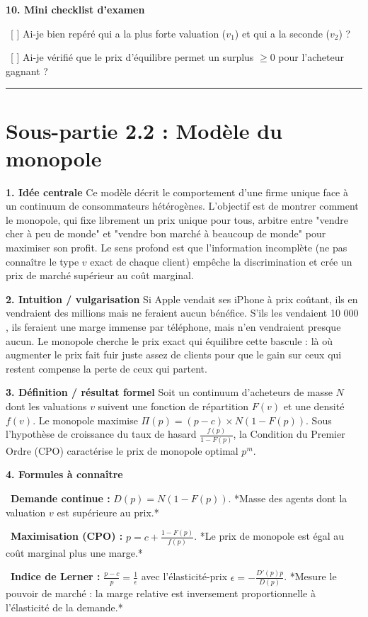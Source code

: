 \documentclass[11pt, a4paper]{report}
\begin{document}
\textbf{10. Mini checklist d'examen}
\par \textbullet\ [ ] Ai-je bien repéré qui a la plus forte valuation ($v_1$) et qui a la seconde ($v_2$) ?
\par \textbullet\ [ ] Ai-je vérifié que le prix d'équilibre permet un surplus $\ge 0$ pour l'acheteur gagnant ?

\vspace{1cm}\hrule\vspace{1cm}

\section{Sous-partie 2.2 : Modèle du monopole}

\textbf{1. Idée centrale}
Ce modèle décrit le comportement d'une firme unique face à un continuum de consommateurs hétérogènes. L'objectif est de montrer comment le monopole, qui fixe librement un prix unique pour tous, arbitre entre "vendre cher à peu de monde" et "vendre bon marché à beaucoup de monde" pour maximiser son profit. Le sens profond est que l'information incomplète (ne pas connaître le type $v$ exact de chaque client) empêche la discrimination et crée un prix de marché supérieur au coût marginal.

\textbf{2. Intuition / vulgarisation}
Si Apple vendait ses iPhone à prix coûtant, ils en vendraient des millions mais ne feraient aucun bénéfice. S'ils les vendaient 10 000 \texteuro{}, ils feraient une marge immense par téléphone, mais n'en vendraient presque aucun. Le monopole cherche le prix exact qui équilibre cette bascule : là où augmenter le prix fait fuir juste assez de clients pour que le gain sur ceux qui restent compense la perte de ceux qui partent.

\textbf{3. Définition / résultat formel}
Soit un continuum d'acheteurs de masse $N$ dont les valuations $v$ suivent une fonction de répartition $F(v)$ et une densité $f(v)$. 
Le monopole maximise $\Pi(p) = (p-c) \times N(1-F(p))$.
Sous l'hypothèse de croissance du taux de hasard $\frac{f(p)}{1-F(p)}$, la Condition du Premier Ordre (CPO) caractérise le prix de monopole optimal $p^m$.

\textbf{4. Formules à connaître}
\par \textbullet\ \textbf{Demande continue :} $D(p) = N(1 - F(p))$. *Masse des agents dont la valuation $v$ est supérieure au prix.*
\par \textbullet\ \textbf{Maximisation (CPO) :} $p = c + \frac{1 - F(p)}{f(p)}$. *Le prix de monopole est égal au coût marginal plus une marge.*
\par \textbullet\ \textbf{Indice de Lerner :} $\frac{p - c}{p} = \frac{1}{\epsilon}$ avec l'élasticité-prix $\epsilon = -\frac{D'(p)p}{D(p)}$. *Mesure le pouvoir de marché : la marge relative est inversement proportionnelle à l'élasticité de la demande.*
\end{document}
